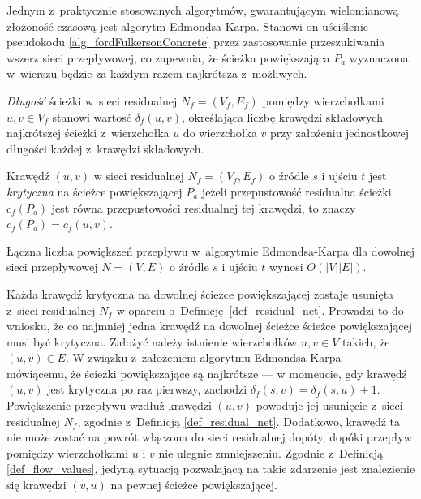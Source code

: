 \par{
  Jednym z~praktycznie stosowanych algorytmów, gwarantującym wielomianową złożoność czasową jest algorytm Edmondsa-Karpa.
  Stanowi on uściślenie pseudokodu \ref{alg_fordFulkersonConcrete} przez zastosowanie przeszukiwania wszerz sieci przepływowej, co zapewnia, że ścieżka powiększająca $P_a$ wyznaczona w~wierszu  będzie za każdym razem najkrótsza z~możliwych.
  \begin{definition}
    \emph{Długość} ścieżki w~sieci residualnej $N_f=(V_f, E_f)$ pomiędzy wierzchołkami $u, v \in V_f$ stanowi wartosć $\delta_f(u, v)$, określająca liczbę krawędzi składowych najkrótszej ścieżki z~wierzchołka $u$ do wierzchołka $v$ przy założeniu jednostkowej długości każdej z~krawędzi składowych.
  \end{definition}
  \begin{definition}
    Krawędź $(u, v)$ w sieci residualnej $N_f=(V_f, E_f)$ o źródle $s$ i ujściu $t$ jest \emph{krytyczna} na ścieżce powiększającej $P_a$ jeżeli przepustowość residualna ścieżki $c_f(P_a)$ jest równa przepustowości residualnej tej krawędzi, to znaczy $c_f(P_a)=c_f(u, v)$.
  \end{definition}
  \begin{theorem}
    Łączna liczba powiększeń przepływu w~algorytmie Edmondsa-Karpa dla dowolnej sieci przepływowej $N=(V, E)$ o źródle $s$ i ujściu $t$ wynosi $O(|V||E|)$.
  \end{theorem}
  \begin{bproof}
    Każda krawędź krytyczna na dowolnej ścieżce powiększającej zostaje usunięta z~sieci residualnej $N_f$ w oparciu o~Definicję~\ref{def_residual_net}.
    Prowadzi to do wniosku, że co najmniej jedna krawędź na dowolnej ścieżce ścieżce powiększającej musi być krytyczna.
    Założyć należy istnienie wierzchołków $u, v \in V$ takich, że $(u, v) \in E$.
    W związku z~założeniem algorytmu Edmondsa-Karpa --- mówiącemu, że ścieżki powiększające są najkrótsze --- w momencie, gdy krawędź $(u, v)$ jest krytyczna po raz pierwszy, zachodzi $\delta_f(s, v)=\delta_f(s, u)+1$.
    Powiększenie przepływu wzdłuż krawędzi $(u, v)$ powoduje jej usunięcie z~sieci residualnej $N_f$, zgodnie z~Definicją \ref{def_residual_net}.
    Dodatkowo, krawędź ta nie może zostać na powrót włączona do sieci residualnej dopóty, dopóki przepływ pomiędzy wierzchołkami $u$ i $v$ nie ulegnie zmniejszeniu.
    Zgodnie z~Definicją \ref{def_flow_values}, jedyną sytuacją pozwalającą na takie zdarzenie jest znalezienie się krawędzi $(v, u)$ na pewnej ścieżce powiększającej.

\end{bproof}}
